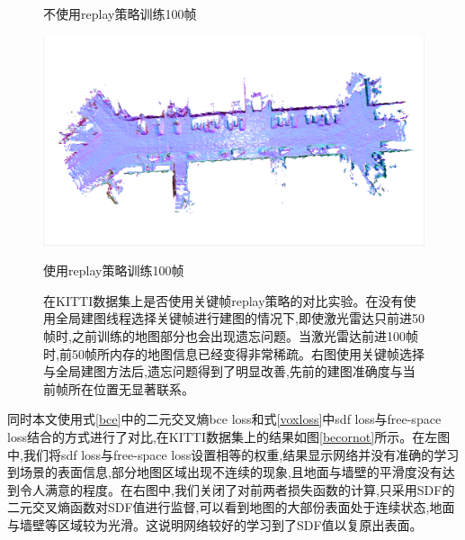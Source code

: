 \begin{figure}[htbp]
\begin{minipage}{0.5\linewidth}
        \caption*{不使用replay策略训练100帧}
	\end{minipage}\hfill
	\begin{minipage}{0.5\linewidth}
		\centering
		\includegraphics[width=1\linewidth]{figures/100o.png}
        \caption*{使用replay策略训练100帧}
	\end{minipage}
    \caption{在KITTI数据集上是否使用关键帧replay策略的对比实验。在没有使用全局建图线程选择关键帧进行建图的情况下,即使激光雷达只前进50帧时,之前训练的地图部分也会出现遗忘问题。当激光雷达前进100帧时,前50帧所内存的地图信息已经变得非常稀疏。右图使用关键帧选择与全局建图方法后,遗忘问题得到了明显改善,先前的建图准确度与当前帧所在位置无显著联系。}\label{replay}
\end{figure}

同时本文使用式\ref{bce}中的二元交叉熵bce loss和式\ref{voxloss}中sdf loss与free-space loss结合的方式进行了对比,在KITTI数据集上的结果如图\ref{becornot}所示。在左图中,我们将sdf loss与free-space loss设置相等的权重,结果显示网络并没有准确的学习到场景的表面信息,部分地图区域出现不连续的现象,且地面与墙壁的平滑度没有达到令人满意的程度。在右图中,我们关闭了对前两者损失函数的计算,只采用SDF的二元交叉熵函数对SDF值进行监督,可以看到地图的大部份表面处于连续状态,地面与墙壁等区域较为光滑。这说明网络较好的学习到了SDF值以复原出表面。

